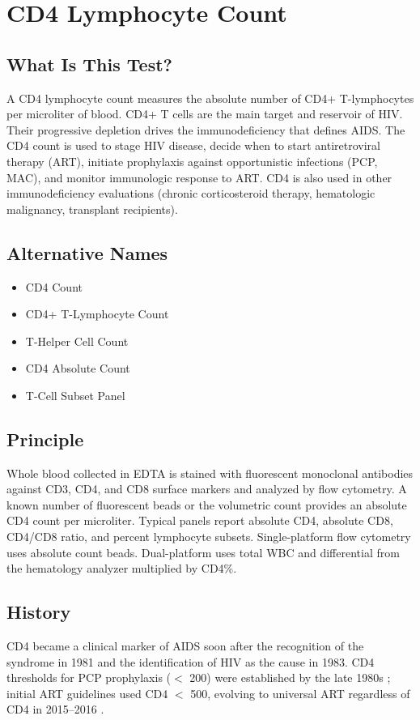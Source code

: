 \chapter{CD4 Lymphocyte Count}

\section*{What Is This Test?}
A CD4 lymphocyte count measures the absolute number of CD4+ T-lymphocytes per microliter of blood. CD4+ T cells are the main target and reservoir of HIV. Their progressive depletion drives the immunodeficiency that defines AIDS. The CD4 count is used to stage HIV disease, decide when to start antiretroviral therapy (ART), initiate prophylaxis against opportunistic infections (PCP, MAC), and monitor immunologic response to ART. CD4 is also used in other immunodeficiency evaluations (chronic corticosteroid therapy, hematologic malignancy, transplant recipients).

\section*{Alternative Names}
\begin{itemize}
  \item CD4 Count
  \item CD4+ T-Lymphocyte Count
  \item T-Helper Cell Count
  \item CD4 Absolute Count
  \item T-Cell Subset Panel
\end{itemize}
\section*{Principle}
Whole blood collected in EDTA is stained with fluorescent monoclonal antibodies against CD3, CD4, and CD8 surface markers and analyzed by flow cytometry. A known number of fluorescent beads or the volumetric count provides an absolute CD4 count per microliter. Typical panels report absolute CD4, absolute CD8, CD4/CD8 ratio, and percent lymphocyte subsets. Single-platform flow cytometry uses absolute count beads. Dual-platform uses total WBC and differential from the hematology analyzer multiplied by CD4\%.

\section*{History}
CD4 became a clinical marker of AIDS soon after the recognition of the syndrome in 1981 and the identification of HIV as the cause in 1983. CD4 thresholds for PCP prophylaxis ($<$ 200) were established by the late 1980s \cite{cdc1992}; initial ART guidelines used CD4 $<$ 500, evolving to universal ART regardless of CD4 in 2015--2016 \cite{lundgren2015}.

